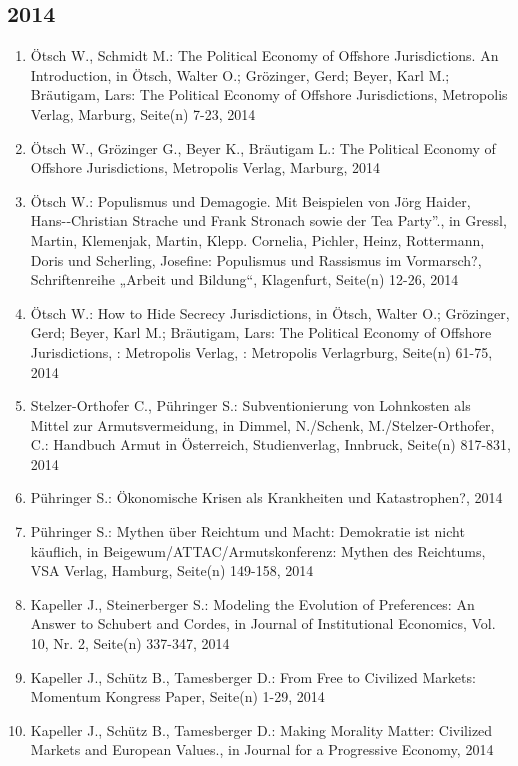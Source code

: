 \subsection*{2014}
\begin{enumerate}
    	 \item Ötsch W., Schmidt M.: The Political Economy of Offshore Jurisdictions. An Introduction, in Ötsch, Walter O.; Grözinger, Gerd; Beyer, Karl M.; Bräutigam, Lars: The Political Economy of Offshore Jurisdictions, Metropolis Verlag, Marburg, Seite(n) 7-23, 2014
	 \item Ötsch W., Grözinger G., Beyer K., Bräutigam L.: The Political Economy of Offshore Jurisdictions, Metropolis Verlag, Marburg, 2014
	 \item Ötsch W.: Populismus und Demagogie. Mit Beispielen von Jörg Haider, Hans-­‐Christian Strache und Frank Stronach sowie der Tea Party”., in Gressl, Martin, Klemenjak, Martin, Klepp. Cornelia, Pichler, Heinz, Rottermann, Doris und Scherling, Josefine: Populismus und Rassismus im Vormarsch?, Schriftenreihe „Arbeit und Bildung“, Klagenfurt, Seite(n) 12-26, 2014
	 \item Ötsch W.: How to Hide Secrecy Jurisdictions, in Ötsch, Walter O.; Grözinger, Gerd; Beyer, Karl M.; Bräutigam, Lars: The Political Economy of Offshore Jurisdictions, : Metropolis Verlag, : Metropolis Verlagrburg, Seite(n) 61-75, 2014
	 \item Stelzer-Orthofer C., Pühringer S.: Subventionierung von Lohnkosten als Mittel zur Armutsvermeidung, in Dimmel, N./Schenk, M./Stelzer-Orthofer, C.: Handbuch Armut in Österreich, Studienverlag, Innbruck, Seite(n) 817-831, 2014
	 \item Pühringer S.: Ökonomische Krisen als Krankheiten und Katastrophen?, 2014
	 \item Pühringer S.: Mythen über Reichtum und Macht: Demokratie ist nicht käuflich, in Beigewum/ATTAC/Armutskonferenz: Mythen des Reichtums, VSA Verlag, Hamburg, Seite(n) 149-158, 2014
	 \item Kapeller J., Steinerberger S.: Modeling the Evolution of Preferences: An Answer to Schubert and Cordes, in Journal of Institutional Economics, Vol. 10, Nr. 2, Seite(n) 337-347, 2014
	 \item Kapeller J., Schütz B., Tamesberger D.: From Free to Civilized Markets: Momentum Kongress Paper, Seite(n) 1-29, 2014
	 \item Kapeller J., Schütz B., Tamesberger D.: Making Morality Matter: Civilized Markets and European Values., in Journal for a Progressive Economy, 2014

\end{enumerate}
